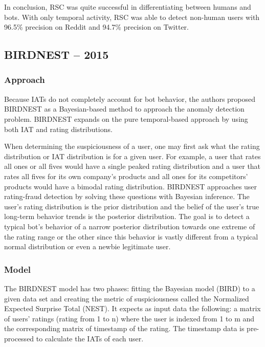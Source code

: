 \documentclass[11pt, oneside]{article}   	%
\begin{document}
\quad In conclusion, RSC was quite successful in differentiating between humans and bots.
With only temporal activity, RSC was able to detect non-human users with 96.5\% precision on Reddit and 94.7\% precision on Twitter.

\subsection*{BIRDNEST -- 2015}

\subsubsection*{Approach}

\quad Because IATs do not completely account for bot behavior, the authors proposed BIRDNEST \cite{birdnest} as a Bayesian-based method to approach the anomaly detection problem. 
BIRDNEST expands on the pure temporal-based approach by using both IAT and rating distributions.

\quad When determining the suspiciousness of a user, one may first ask what the rating distribution or IAT distribution is for a given user.
For example, a user that rates all ones or all fives would have a single peaked rating distribution and a user that rates all fives for its own company's products and all ones for its competitors' products would have a bimodal rating distribution.
BIRDNEST approaches user rating-fraud detection by solving these questions with Bayesian inference.
The user's rating distribution is the prior distribution and the belief of the user's true long-term behavior trends is the posterior distribution.
The goal is to detect a typical bot's behavior of a narrow posterior distribution towards one extreme of the rating range or the other since this behavior is vastly different from a typical normal distribution or even a newbie legitimate user.

\subsubsection*{Model}

\quad The BIRDNEST model has two phases: fitting the Bayesian model (BIRD) to a given data set and creating the metric of suspiciousness called the Normalized Expected Surprise Total (NEST).
It expects as input data the following: a matrix of users' ratings (rating from 1 to n) where the user is indexed from 1 to m and the corresponding matrix of timestamp of the rating.
The timestamp data is pre-processed to calculate the IATs of each user.
\end{document}
